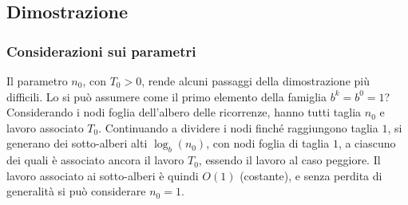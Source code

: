 \subsection{Dimostrazione}

\subsubsection{Considerazioni sui parametri}
Il parametro $n_0$, con $T_0>0$, rende alcuni passaggi della dimostrazione più difficili. Lo si può assumere come il primo elemento della famiglia $b^k=b^0=1$? Considerando i nodi foglia dell'albero delle ricorrenze, hanno tutti taglia $n_0$ e lavoro associato $T_0$. Continuando a dividere i nodi finché raggiungono taglia $1$, si generano dei sotto-alberi alti $\log_b \left( n_0 \right)$, con nodi foglia di taglia $1$, a ciascuno dei quali è associato ancora il lavoro $T_0$, essendo il lavoro al caso peggiore. Il lavoro associato ai sotto-alberi è quindi $O(1)$ (costante), e senza perdita di generalità si può considerare $n_0=1$.

